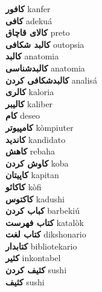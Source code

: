 \textbf{ کافور  } kanfer \\
\textbf{ کافی  } adekuá \\
\textbf{ کالای قاچاق  } preto \\
\textbf{ کالبد شکافی  } outopsia \\
\textbf{ کالبد  } anatomia \\
\textbf{ کالبدشناسی  } anatomia \\
\textbf{ کالبدشکافی کردن  } analisá \\
\textbf{ کالری  } kaloria \\
\textbf{ کالیبر  } kaliber \\
\textbf{ کام  } deseo \\
\textbf{ کامپیوتر  } kòmpiuter \\
\textbf{ کاندید  } kandidato \\
\textbf{ کاهش  } rebaha \\
\textbf{ کاوش کردن  } koba \\
\textbf{ کاپیتان  } kapitan \\
\textbf{ کاکائو  } kòfi \\
\textbf{ کاکتوس  } kadushi \\
\textbf{ کباب کردن  } barbekiú \\
\textbf{ کتاب فهرست  } katalòk \\
\textbf{ کتاب لغت  } dikshonario \\
\textbf{ کتابدار  } bibliotekario \\
\textbf{ کثیر  } inkontabel \\
\textbf{ کثیف کردن  } sushi \\
\textbf{ کثیف  } sushi \\
